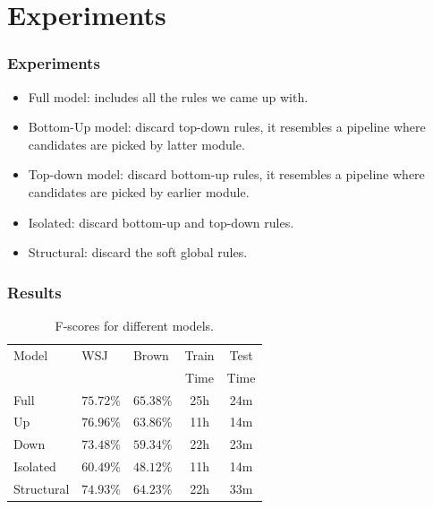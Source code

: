 \documentclass{beamer} \setbeamertemplate{navigation symbols}{}
\begin{document}
\section{Experiments}
\begin{frame}
  \frametitle{Experiments}

  \begin{itemize}
  \item Full model: includes all the rules we came up with.
  \item Bottom-Up model: discard top-down rules, it resembles a
    pipeline where candidates are picked by latter module.
  \item Top-down model: discard bottom-up rules, it resembles a
    pipeline where candidates are picked by earlier module.
  \item Isolated: discard bottom-up and top-down rules.
  \item Structural: discard the soft global rules.
  \end{itemize}
\end{frame}

\begin{frame}
  \frametitle{Results}

  \begin{table}
    \begin{center}
      \small
      \begin{tabular}{|l|l|l|c|c|}\hline
        Model                & WSJ                & Brown              & Train & Test\\
        &                    &                    & Time & Time\\\hline\hline
        Full         & $75.72\%$          & $\mathbf{65.38}\%$ & 25h & 24m\\\hline
        Up           & $\mathbf{76.96\%}$ & $63.86\%$          & 11h & 14m\\\hline
        Down         & $73.48\%$          & $59.34\%$          & 22h & 23m\\\hline
        Isolated     & $60.49\%$          & $48.12\%$          & 11h & 14m\\\hline
        Structural   & $74.93\%$          & $64.23\%$          & 22h & 33m\\\hline   
      \end{tabular}
      \caption{F-scores for different models.}
      \label{tbl:results}
      \normalsize
    \end{center}
  \end{table}
\end{frame}
\end{document}
